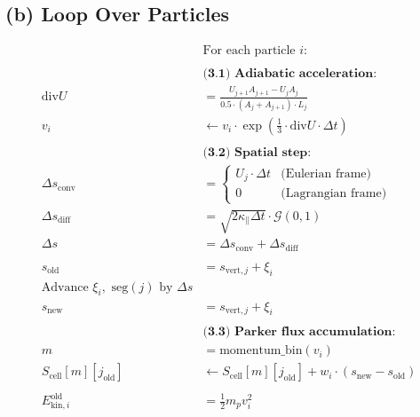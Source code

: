\subsection*{(b) Loop Over Particles}
\begin{align*}
&\text{For each particle } i: \\
\\
&\textbf{(3.1) Adiabatic acceleration:} \\
\mathrm{div}U &= \frac{U_{j+1} A_{j+1} - U_j A_j}{0.5 \cdot (A_j + A_{j+1}) \cdot L_j} \\
v_i &\leftarrow v_i \cdot \exp\left( \tfrac{1}{3} \cdot \mathrm{div}U \cdot \Delta t \right) \\
\\
&\textbf{(3.2) Spatial step:} \\
\Delta s_{\mathrm{conv}} &=
\begin{cases}
U_j \cdot \Delta t & \text{(Eulerian frame)} \\
0 & \text{(Lagrangian frame)}
\end{cases} \\
\Delta s_{\mathrm{diff}} &= \sqrt{2 \kappa_\parallel \Delta t} \cdot \mathcal{G}(0,1) \\
\Delta s &= \Delta s_{\mathrm{conv}} + \Delta s_{\mathrm{diff}} \\
\\
s_{\mathrm{old}} &= s_{\mathrm{vert}, j} + \xi_i \\
\text{Advance } \xi_i, \text{ seg}(j) \text{ by } \Delta s \\
s_{\mathrm{new}} &= s_{\mathrm{vert}, j} + \xi_i \\
\\
&\textbf{(3.3) Parker flux accumulation:} \\
m &= \text{momentum\_bin}(v_i) \\
S_{\mathrm{cell}}[m][j_{\mathrm{old}}] &\leftarrow S_{\mathrm{cell}}[m][j_{\mathrm{old}}] + w_i \cdot (s_{\mathrm{new}} - s_{\mathrm{old}}) \\
\\
E_{\mathrm{kin}, i}^{\mathrm{old}} &= \tfrac{1}{2} m_p v_i^2
\end{align*}


